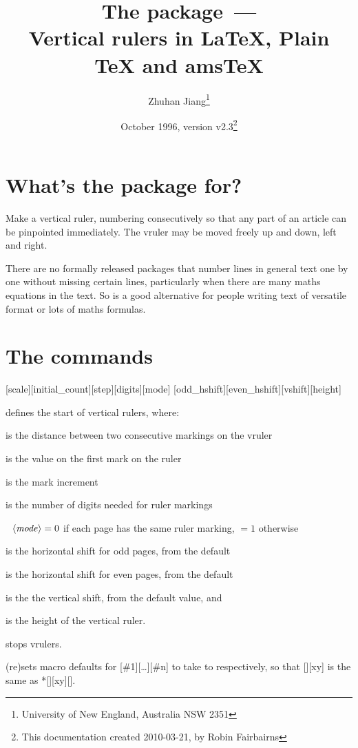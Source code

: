 \documentclass[a4paper]{article}
\newcommand\nl{\par\noindent}
\begin{document}
\title{The  package~---\\
  Vertical rulers in \LaTeX{}, Plain \TeX{} and ams\TeX{}}
\author{Zhuhan Jiang\thanks{University of New England, Australia NSW 2351}}
\date{October 1996, version v2.3\thanks{%
    This documentation created 2010-03-21, by Robin Fairbairns}}
\maketitle

\section{What's the package for?}

Make a vertical ruler, numbering consecutively so that any part of an
article can be pinpointed immediately.  The vruler may be moved freely
up and down, left and right.
         
There are no formally released packages that number lines in general
text one by one without missing certain lines, particularly when there
are many maths equations in the text. So  is a good
alternative for people writing text of versatile format or lots of
maths formulas.

\section{The commands}

[scale][initial_count][step][digits][mode]%
[odd_hshift][even_hshift][vshift][height]\nl
defines the start of vertical rulers, where:
\par\addvspace{1ex}
\noindent
{} is the distance between two consecutive markings on the
vruler\nl
{} is the value on the first mark on the ruler\nl
{} is the mark increment\nl
{} is the number of digits needed for ruler markings\nl
$\text{\meta{mode}}=0$ if each page has the same ruler marking, $=1$
otherwise\nl
{} is the horizontal shift for odd pages, from the
default\nl
{} is the horizontal shift for even pages, from the
default\nl
{} is the the vertical shift, from the default value, and\nl
{} is the height of the vertical ruler.
\par\addvspace{1ex}
\noindent{} stops vrulers.
\par\addvspace{1ex}
\noindent{}\nl
(re)sets macro  defaults for
[\#1][\dots{}][\#n] to take  to
 respectively, so that [][xy] is
the same as
*[][xy][].
\end{document}
